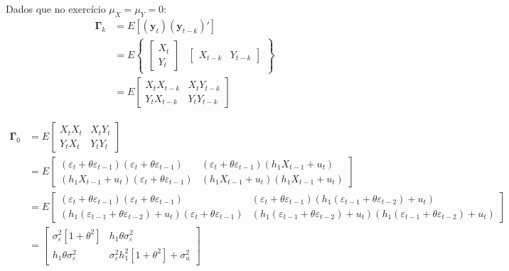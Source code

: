 \begin{enumerate}
\begin{enumerate}
 Dados que no exercício $\mu_X=\mu_Y=0$:
	 \begin{align*}
	 	\boldsymbol{\Gamma}_k&=E[(\mathbf{y}_t)(\mathbf{y}_{t-k})']\\
	 	&=E\begin{Bmatrix}
	 		\begin{bmatrix}
	 			X_t\\
	 			Y_t
	 		\end{bmatrix}&\begin{bmatrix}
	 		X_{t-k}&Y_{t-k}
 		\end{bmatrix}
	 	\end{Bmatrix}\\
 	&=E\begin{bmatrix}
 		X_tX_{t-k}&X_tY_{t-k}\\
 		Y_tX_{t-k}&Y_tY_{t-k}
 	\end{bmatrix}
	 \end{align*}
 
	 \begin{align*}
	 	\boldsymbol{\Gamma}_0&=E\begin{bmatrix}
	 		X_tX_t&X_tY_t\\
	 		Y_tX_t&Y_tY_t
	 	\end{bmatrix}\\
 	&=E\begin{bmatrix}
 		(\varepsilon_t+\theta\varepsilon_{t-1})(\varepsilon_t+\theta\varepsilon_{t-1})&(\varepsilon_t+\theta\varepsilon_{t-1})(h_1X_{t-1}+u_t)\\
 		(h_1X_{t-1}+u_t)(\varepsilon_t+\theta\varepsilon_{t-1})&(h_1X_{t-1}+u_t)(h_1X_{t-1}+u_t)
 	\end{bmatrix}\\
 &=E\begin{bmatrix}
 	(\varepsilon_t+\theta\varepsilon_{t-1})(\varepsilon_t+\theta\varepsilon_{t-1})&(\varepsilon_t+\theta\varepsilon_{t-1})(h_1(\varepsilon_{t-1}+\theta\varepsilon_{t-2})+u_t)\\
 	(h_1(\varepsilon_{t-1}+\theta\varepsilon_{t-2})+u_t)(\varepsilon_t+\theta\varepsilon_{t-1})&(h_1(\varepsilon_{t-1}+\theta\varepsilon_{t-2})+u_t)(h_1(\varepsilon_{t-1}+\theta\varepsilon_{t-2})+u_t)
 \end{bmatrix}\\
		&=\begin{bmatrix}
			\sigma^2_{\varepsilon}[1+\theta^2]&h_1\theta\sigma^2_{\varepsilon}\\
			h_1\theta\sigma^2_{\varepsilon}&\sigma^2_{\varepsilon}h_1^2[1+\theta^2]+\sigma^2_u
		\end{bmatrix}
	 \end{align*}
 

\end{enumerate}
\end{enumerate}
